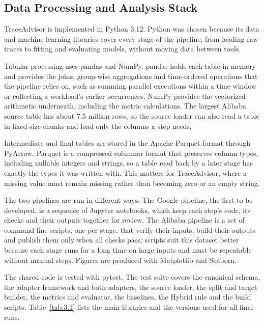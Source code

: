 \documentclass{IEEEtran}
\begin{document}
\subsection{Data Processing and Analysis Stack}\label{sec:3.1}

TraceAdvisor is implemented in Python 3.12. Python was chosen because its data and machine learning libraries cover every stage of the pipeline, from loading raw traces to fitting and evaluating models, without moving data between tools.

Tabular processing uses pandas and NumPy. pandas holds each table in memory and provides the joins, group-wise aggregations and time-ordered operations that the pipeline relies on, such as summing parallel executions within a time window or collecting a workload's earlier occurrences. NumPy provides the vectorized arithmetic underneath, including the metric calculations. The largest Alibaba source table has about 7.5 million rows, so the source loader can also read a table in fixed-size chunks and load only the columns a step needs.

Intermediate and final tables are stored in the Apache Parquet format through PyArrow. Parquet is a compressed columnar format that preserves column types, including nullable integers and strings, so a table read back by a later stage has exactly the types it was written with. This matters for TraceAdvisor, where a missing value must remain missing rather than becoming zero or an empty string.

The two pipelines are run in different ways. The Google pipeline, the first to be developed, is a sequence of Jupyter notebooks, which keep each step's code, its checks and their outputs together for review. The Alibaba pipeline is a set of command-line scripts, one per stage, that verify their inputs, build their outputs and publish them only when all checks pass; scripts suit this dataset better because each stage runs for a long time on large inputs and must be repeatable without manual steps. Figures are produced with Matplotlib and Seaborn.

The shared code is tested with pytest. The test suite covers the canonical schema, the adapter framework and both adapters, the source loader, the split and target builder, the metrics and evaluator, the baselines, the Hybrid rule and the build scripts. Table~\ref{tab:3.1} lists the main libraries and the versions used for all final runs.
\end{document}
